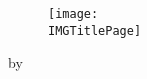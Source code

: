 \pagecolor{brandcolor}
\color{white}
\begin{titlepage}

    \begin{figure}[ht]
    \centering
    \texttt{[image: \\IMGTitlePage]}
    \end{figure}
    
    \begin{center}
        {\Huge \DICTDocTitle}
    \end{center}
    
    \vfill
    
    \begin{center}
        {\Large by}
    \end{center}
    
    \begin{center}
        {\Large \DICTDocAuthor}
    \end{center}
    
     \begin{center}
        {\Large \DICTDocEmail}
    \end{center}
    
    \begin{center}
        {\Large \DICTDocDate}
    \end{center}
    
    \vspace{5mm}
    
\end{titlepage}
\pagecolor{white}
\color{black}